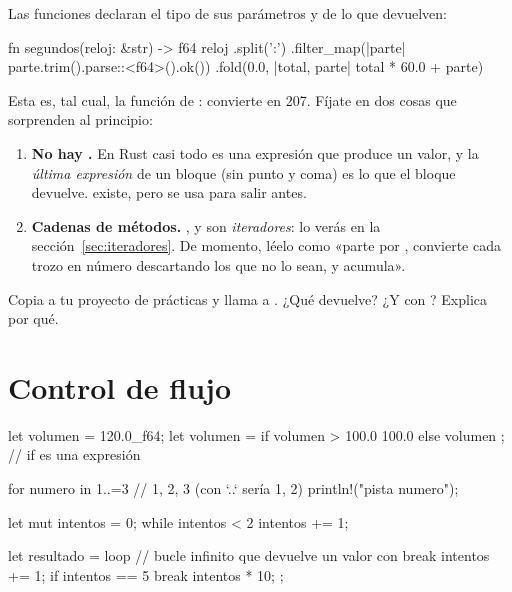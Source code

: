 Las funciones declaran el tipo de sus parámetros y de lo que devuelven:

\begin{rust}
fn segundos(reloj: &str) -> f64 {
    reloj
        .split(':')
        .filter_map(|parte| parte.trim().parse::<f64>().ok())
        .fold(0.0, |total, parte| total * 60.0 + parte)
}
\end{rust}

Esta es, tal cual, la función  de : convierte  en
207. Fíjate en dos cosas que sorprenden al principio:

\begin{enumerate}
  \item \textbf{No hay .} En Rust casi todo es una expresión que produce un valor,
  y la \emph{última expresión} de un bloque (sin punto y coma) es lo que el bloque devuelve.
   existe, pero se usa para salir antes.
  \item \textbf{Cadenas de métodos.} ,  y  son
  \emph{iteradores}: lo verás en la sección~\ref{sec:iteradores}. De momento, léelo como «parte
  por \cod{:}, convierte cada trozo en número descartando los que no lo sean, y acumula».
\end{enumerate}

\begin{ejercicio}
Copia  a tu proyecto de prácticas y llama a
. ¿Qué devuelve? ¿Y con ? Explica por qué.
\end{ejercicio}

\section{Control de flujo}

\begin{rust}
let volumen = 120.0_f64;
let volumen = if volumen > 100.0 { 100.0 } else { volumen };  // if es una expresión

for numero in 1..=3 {            // 1, 2, 3 (con `..` sería 1, 2)
    println!("pista {numero}");
}

let mut intentos = 0;
while intentos < 2 {
    intentos += 1;
}

let resultado = loop {           // bucle infinito que devuelve un valor con break
    intentos += 1;
    if intentos == 5 { break intentos * 10; }
};
\end{rust}

